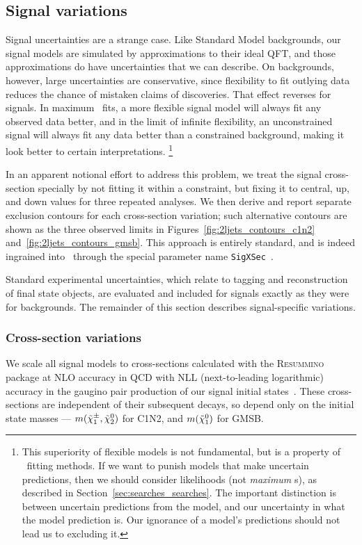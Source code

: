 \subsection{Signal variations}
\label{sec:2ljets_signal_variations}
Signal uncertainties are a strange case.
Like Standard Model backgrounds, our signal models are simulated by
approximations to their ideal QFT, and those approximations do have
uncertainties that we can describe.
On backgrounds, however, large uncertainties are conservative, since
flexibility to fit outlying data reduces the chance of mistaken claims of
discoveries.
That effect reverses for signals.
In maximum \heplikelihood\ fits, a more flexible
signal model will always fit any observed data better, and in the limit of
infinite flexibility, an unconstrained signal will always fit
any data better than a constrained background, making it look better to certain
interpretations.%
\footnote{%
This superiority of flexible models is not fundamental, but is a property of
\heplikelihood\ fitting methods.
If we want to punish models that make uncertain predictions, then we should
consider likelihoods (not \emph{maximum} \heplikelihood s), as described in
Section~\ref{sec:searches_searches}.
The important distinction is between uncertain predictions from the model,
and our uncertainty in what the model prediction is.
Our ignorance of a model's predictions should not lead us to excluding it.
}

In an apparent notional effort to address this problem, we treat the signal
cross-section specially by not fitting it within a constraint, but fixing it
to central, up, and down values for three repeated analyses.
We then derive and report separate exclusion contours for each cross-section
variation;
such alternative contours are shown as the three observed limits
in Figures~\ref{fig:2ljets_contours_c1n2} and~\ref{fig:2ljets_contours_gmsb}.
This approach is entirely standard, and is indeed ingrained into \histfitter\
through the special parameter name
\texttt{SigXSec}~\cite{histfitter2014, histfittergithub}.

Standard experimental uncertainties, which relate to tagging and
reconstruction of final state objects, are evaluated and included for signals
exactly as they were for backgrounds.
The remainder of this section describes signal-specific variations.

\subsubsection{Cross-section variations}
\label{sec:2ljets_xsec_variations}
We scale all signal models to cross-sections calculated with the
\textsc{Resummino} package at NLO accuracy in QCD with NLL
(next-to-leading logarithmic) accuracy in the gaugino pair production of our
signal initial states~\cite{Fuks:2012qx, Fuks:2013vua}.
These cross-sections are independent of their subsequent decays, so depend only
on the initial state masses ---
$m(\tilde\chi^\pm_1, \tilde\chi^0_2)$ for C1N2, and
$m(\tilde\chi^0_1)$ for GMSB.

